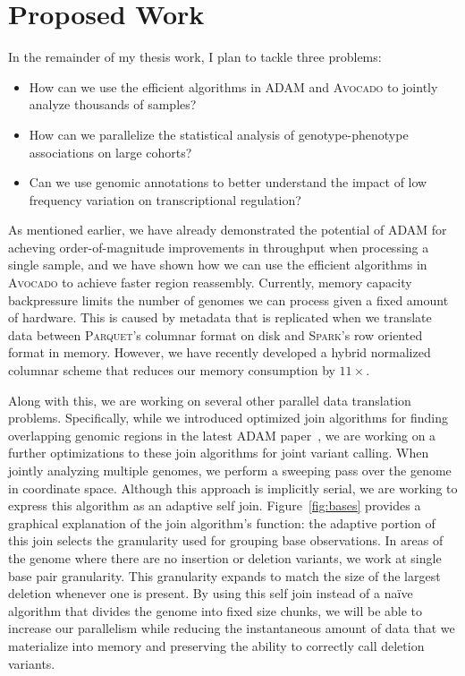 \documentclass[11pt]{article} %
\begin{document}
\section{Proposed Work}

In the remainder of my thesis work, I plan to tackle three problems:

\begin{itemize}
\item How can we use the efficient algorithms in \textsc{ADAM} and \textsc{Avocado} to jointly
analyze thousands of samples?
\item How can we parallelize the statistical analysis of genotype-phenotype associations on
large cohorts?
\item Can we use genomic annotations to better understand the impact of low frequency variation
on transcriptional regulation?
\end{itemize}

As mentioned earlier, we have already demonstrated the potential of \textsc{ADAM} for acheving
order-of-magnitude improvements in throughput when processing a single sample, and we have
shown how we can use the efficient algorithms in \textsc{Avocado} to achieve faster region
reassembly. Currently, memory capacity backpressure limits the number of genomes we can process
given a fixed amount of hardware. This is caused by metadata that is replicated when we translate
data between \textsc{Parquet}'s columnar format on disk and \textsc{Spark}'s row oriented format
in memory. However, we have recently developed a hybrid normalized columnar scheme that reduces
our memory consumption by $11\times$.

Along with this, we are working on several other parallel data translation problems. Specifically,
while we introduced optimized join algorithms for finding overlapping genomic regions in the
latest \textsc{ADAM} paper~\cite{nothaft15}, we are working on a further optimizations to these
join algorithms for joint variant calling. When jointly analyzing multiple genomes, we perform a
sweeping pass over the genome in coordinate space. Although this approach is implicitly serial,
we are working to express this algorithm as an adaptive self join. Figure~\ref{fig:bases} provides
a graphical explanation of the join algorithm's function: the adaptive portion of this
join selects the granularity used for grouping base observations. In areas of the genome where there
are no insertion or deletion variants, we work at single base pair granularity. This granularity
expands to match the size of the largest deletion whenever one is present. By using this self join
instead of a na\"{i}ve algorithm that divides the genome into fixed size chunks, we will be able
to increase our parallelism while reducing the instantaneous amount of data that we materialize
into memory and preserving the ability to correctly call deletion variants.
\end{document}
